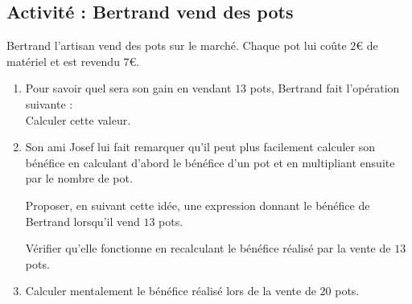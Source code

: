 
\subsection*{Activité : Bertrand vend des pots}

Bertrand l'artisan vend des pots sur le marché. Chaque pot lui coûte \( 2\)€ de matériel et est revendu \( 7\)€.
\begin{enumerate}
    \item
        Pour savoir quel sera son gain en vendant \( 13\) pots, Bertrand fait l'opération suivante :
        \begin{equation}
            
        \end{equation}
        Calculer cette valeur.
    \item
        Son ami Josef lui fait remarquer qu'il peut plus facilement calculer son bénéfice en calculant d'abord le bénéfice d'un pot et en multipliant ensuite par le nombre de pot.

        Proposer, en suivant cette idée, une expression donnant le bénéfice de Bertrand lorsqu'il vend \( 13\) pots.

        Vérifier qu'elle fonctionne en recalculant le bénéfice réalisé par la vente de \( 13\) pots.
    \item
        Calculer mentalement le bénéfice réalisé lors de la vente de \( 20\) pots.
\end{enumerate}
